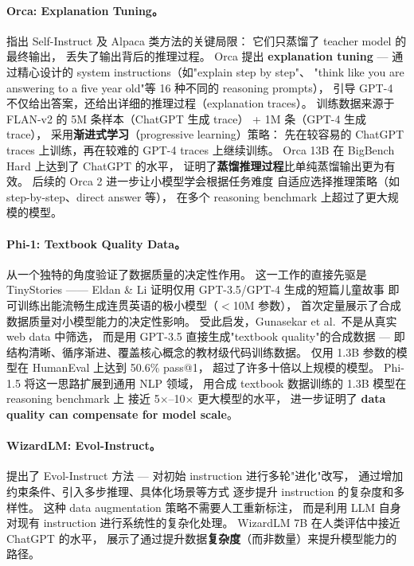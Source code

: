 \paragraph{Orca: Explanation Tuning。}
 指出 Self-Instruct 及 Alpaca 类方法的关键局限：
它们只蒸馏了 teacher model 的最终输出，
丢失了输出背后的推理过程。
Orca 提出 \textbf{explanation tuning} ---
通过精心设计的 system instructions（如"explain step by step"、
"think like you are answering to a five year old"等 16 种不同的 reasoning prompts），
引导 GPT-4 不仅给出答案，还给出详细的推理过程（explanation traces）。
训练数据来源于 FLAN-v2 的 5M 条样本（ChatGPT 生成 trace）
+ 1M 条（GPT-4 生成 trace），
采用\textbf{渐进式学习}（progressive learning）策略：
先在较容易的 ChatGPT traces 上训练，再在较难的 GPT-4 traces 上继续训练。
Orca 13B 在 BigBench Hard 上达到了 ChatGPT 的水平，
证明了\textbf{蒸馏推理过程}比单纯蒸馏输出更为有效。
后续的 Orca 2 \cite{mitra2023orca2} 进一步让小模型学会根据任务难度
自适应选择推理策略（如 step-by-step、direct answer 等），
在多个 reasoning benchmark 上超过了更大规模的模型。

\paragraph{Phi-1: Textbook Quality Data。}
 从一个独特的角度验证了数据质量的决定性作用。
这一工作的直接先驱是 TinyStories \cite{eldan2023tinystories}——
Eldan \& Li 证明仅用 GPT-3.5/GPT-4 生成的短篇儿童故事
即可训练出能流畅生成连贯英语的极小模型（$<$10M 参数），
首次定量展示了合成数据质量对小模型能力的决定性影响。
受此启发，Gunasekar et al.\ 不是从真实 web data 中筛选，
而是用 GPT-3.5 直接生成"textbook quality"的合成数据 ---
即结构清晰、循序渐进、覆盖核心概念的教材级代码训练数据。
仅用 1.3B 参数的模型在 HumanEval 上达到 50.6\% pass@1，
超过了许多十倍以上规模的模型。
Phi-1.5 \cite{li2023phi15} 将这一思路扩展到通用 NLP 领域，
用合成 textbook 数据训练的 1.3B 模型在 reasoning benchmark 上
接近 5$\times$--10$\times$ 更大模型的水平，
进一步证明了 \textbf{data quality can compensate for model scale}。

\paragraph{WizardLM: Evol-Instruct。}
 提出了 Evol-Instruct 方法 ---
对初始 instruction 进行多轮"进化"改写，
通过增加约束条件、引入多步推理、具体化场景等方式
逐步提升 instruction 的复杂度和多样性。
这种 data augmentation 策略不需要人工重新标注，
而是利用 LLM 自身对现有 instruction 进行系统性的复杂化处理。
WizardLM 7B 在人类评估中接近 ChatGPT 的水平，
展示了通过提升数据\textbf{复杂度}（而非数量）来提升模型能力的路径。

